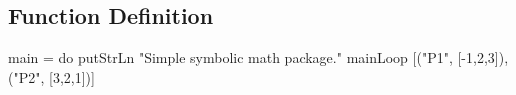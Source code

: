 \subsection{Function Definition}
\begin{code}
main = do
  putStrLn "Simple symbolic math package."
  mainLoop [("P1", [-1,2,3]), ("P2", [3,2,1])]
\end{code}
